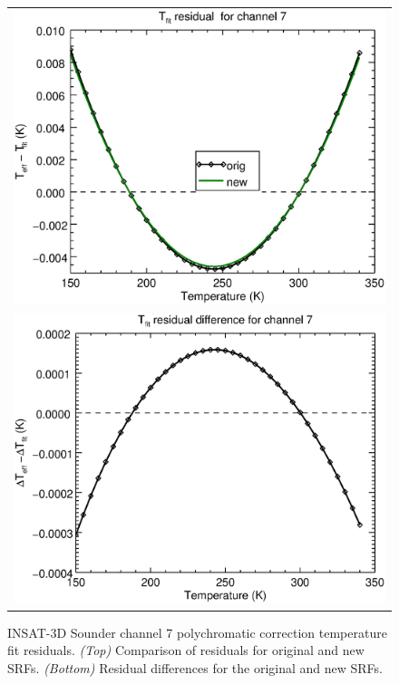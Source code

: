 \begin{figure}[H]
  \centering
  \begin{tabular}{c}
    \includegraphics[scale=0.55]{graphics/sndr/tfit/sndr_insat3d-7.tfit.eps} \\
    \includegraphics[scale=0.55]{graphics/sndr/tfit/sndr_insat3d-7.tfit.difference.eps}
  \end{tabular}
  \caption{INSAT-3D Sounder channel 7 polychromatic correction temperature fit residuals. \emph{(Top)} Comparison of residuals for original and new SRFs. \emph{(Bottom)} Residual differences for the original and new SRFs.}
  \label{fig:sndr_ch7_tfit}
\end{figure}


